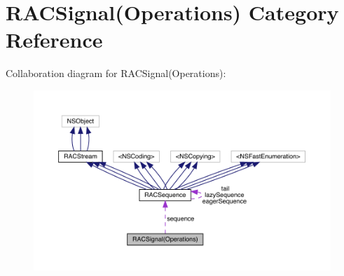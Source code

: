 \hypertarget{category_r_a_c_signal_07_operations_08}{}\section{R\+A\+C\+Signal(Operations) Category Reference}
\label{category_r_a_c_signal_07_operations_08}


Collaboration diagram for R\+A\+C\+Signal(Operations)\+:\nopagebreak
\begin{figure}[H]
\begin{center}
\leavevmode
\includegraphics[width=350pt]{category_r_a_c_signal_07_operations_08__coll__graph}
\end{center}
\end{figure}

